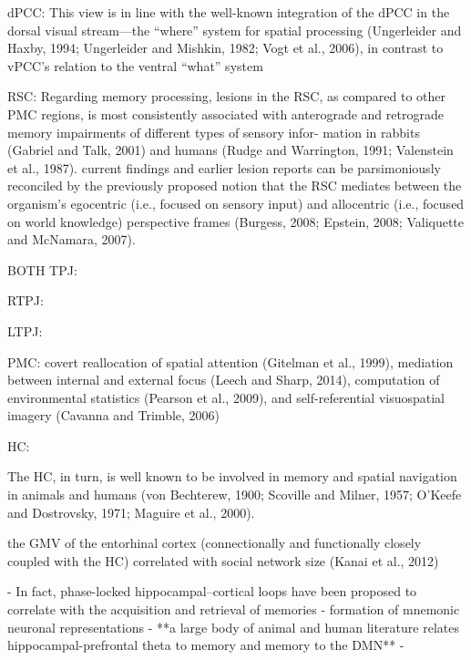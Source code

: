 \documentclass{article} %
\begin{document}
dPCC:
This view is in line with the well-known integration of the dPCC in the dorsal visual stream—the “where” system for spatial processing (Ungerleider and Haxby, 1994; Ungerleider and Mishkin, 1982; Vogt et al., 2006), in contrast to vPCC's relation to the ventral “what” system


RSC:
Regarding memory processing, lesions in the RSC, as compared to other PMC regions, is most consistently associated with anterograde and retrograde memory impairments of different types of sensory infor- mation in rabbits (Gabriel and Talk, 2001) and humans (Rudge and Warrington, 1991; Valenstein et al., 1987). 
current findings and earlier lesion reports can be parsimoniously reconciled by the previously proposed notion that the RSC mediates between the organism's egocentric (i.e., focused on sensory input) and allocentric (i.e., focused on world knowledge) perspective frames (Burgess, 2008; Epstein, 2008; Valiquette and McNamara, 2007). 




BOTH TPJ:



RTPJ:





LTPJ:




PMC:
covert reallocation of spatial attention (Gitelman et al., 1999), mediation between internal and external focus (Leech and Sharp, 2014), computation of environmental statistics (Pearson et al., 2009), and self-referential visuospatial imagery (Cavanna and Trimble, 2006) 







HC:

The HC, in turn, is well known to be involved in memory and spatial navigation in animals and humans (von Bechterew, 1900; Scoville and Milner, 1957; O’Keefe and Dostrovsky, 1971; Maguire et al., 2000).

the GMV of the entorhinal cortex (connectionally and functionally closely coupled with the HC) correlated with social network size (Kanai et al., 2012)

- In fact, phase-locked hippocampal–cortical loops have been proposed to correlate with the acquisition and retrieval of memories
- formation of mnemonic neuronal representations
- **a large body of animal and human literature relates
hippocampal-prefrontal theta to memory and memory to the DMN**
- 
\end{document}
